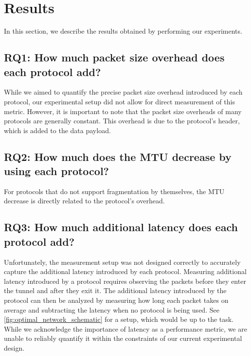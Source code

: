 
\chapter{Results}
\label{chap:results}

In this section, we describe the results obtained by performing our
experiments.

\section{RQ1: How much packet size overhead does each protocol add?}
While we aimed to quantify the precise packet size overhead introduced by each protocol, our experimental setup did not allow for direct measurement of this metric.
However, it is important to note that the packet size overheads of many protocols are generally constant.
This overhead is due to the protocol's header, which is added to the data payload.

\section{RQ2: How much does the MTU decrease by using each protocol?}
For protocols that do not support fragmentation by themselves, the MTU decrease is directly related to the protocol's overhead.

\section{RQ3: How much additional latency does each protocol add?}
Unfortunately, the measurement setup was not designed correctly to accurately capture the additional latency introduced by each protocol.
Measuring additional latency introduced by a protocol requires observing the packets before they enter the tunnel and after they exit it.
The additional latency introduced by the protocol can then be analyzed by measuring how long each packet takes on average and subtracting the latency when no protocol is being used.
See \cref{fig:optimal_network_schematic} for a setup, which would be up to the task.
While we acknowledge the importance of latency as a performance metric, we are unable to reliably quantify it within the constraints of our current experimental design.

